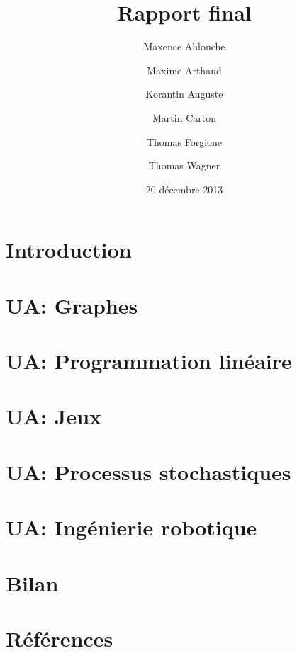 \documentclass{scrartcl}
\title{Rapport final}
\author{Maxence Ahlouche \and Maxime Arthaud \and Korantin Auguste
  \and Martin Carton \and Thomas Forgione \and Thomas Wagner}
\date{20 décembre 2013}
\begin{document}
  
  \newpage
  \tableofcontents

  \newpage
  \section{Introduction}
    

  \newpage
  \section{UA: Graphes}
    

  \newpage
  \section{UA: Programmation linéaire}
    

  \newpage
  \section{UA: Jeux}
    

  \newpage
  \section{UA: Processus stochastiques}
    

  \newpage
  \section{UA: Ingénierie robotique}
    

  \newpage
  \section{Bilan}
    

  \newpage
  \section{Références}
    \begin{thebibliography}{99}
      
    \end{thebibliography}
\end{document}
